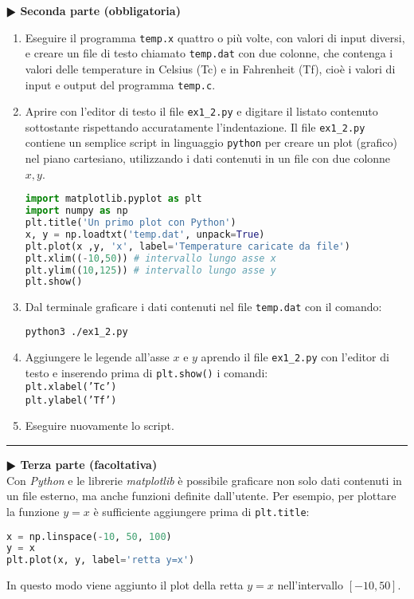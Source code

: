 \documentclass[11pt]{article}
\begin{document}

\textbf{$\RHD$ Seconda parte (obbligatoria)} 
%
\begin{enumerate}
\item Eseguire il programma \texttt{temp.x} quattro o più volte, con valori di input diversi, e creare un file di testo chiamato \texttt{temp.dat} con due colonne,
  che contenga i valori delle temperature in Celsius (Tc) e
  in Fahrenheit (Tf), cioè i valori di input e output del programma \texttt{temp.c}.
\item Aprire con l'editor di testo il file \texttt{ex1\_2.py} e digitare il listato
  contenuto sottostante rispettando accuratamente l'indentazione. Il file \texttt{ex1\_2.py} contiene un
  semplice script in linguaggio \texttt{python} per creare un plot (grafico) nel piano cartesiano, utilizzando i dati contenuti in un file con due colonne $x,y$. 
\begin{lstlisting}[caption={Programma {\it python} \texttt{ex1\_2.py}},language=Python]
import matplotlib.pyplot as plt
import numpy as np
plt.title('Un primo plot con Python')
x, y = np.loadtxt('temp.dat', unpack=True)
plt.plot(x ,y, 'x', label='Temperature caricate da file')
plt.xlim((-10,50)) # intervallo lungo asse x
plt.ylim((10,125)) # intervallo lungo asse y
plt.show()
\end{lstlisting}
\item Dal terminale graficare i dati contenuti nel file \texttt{temp.dat} con il comando:\\
  \begin{lstlisting}[language=bash,numbers=none]
    python3 ./ex1_2.py
\end{lstlisting}
\item Aggiungere le legende all'asse $x$ e $y$ aprendo il file \texttt{ex1\_2.py} con l'editor di testo e inserendo prima di \texttt{plt.show()} i comandi:
\\
\texttt{plt.xlabel('Tc')}
\\
\texttt{plt.ylabel('Tf')}
 \item Eseguire nuovamente lo script.
 \end{enumerate}


\hrule
\vspace{2mm}\textbf{$\RHD$ Terza parte (facoltativa)\\}
%
Con {\it Python\/} e le librerie {\it matplotlib\/} \`e possibile graficare non solo dati contenuti in un file esterno, ma anche funzioni definite dall'utente. Per esempio, 
per plottare la funzione $y=x$ \`e sufficiente aggiungere prima di \texttt{plt.title}: 
\begin{lstlisting}[language=python]
x = np.linspace(-10, 50, 100)
y = x
plt.plot(x, y, label='retta y=x')
\end{lstlisting}
In questo modo viene aggiunto il plot della retta $y=x$ nell'intervallo $[-10,50]$. 
\end{document}
